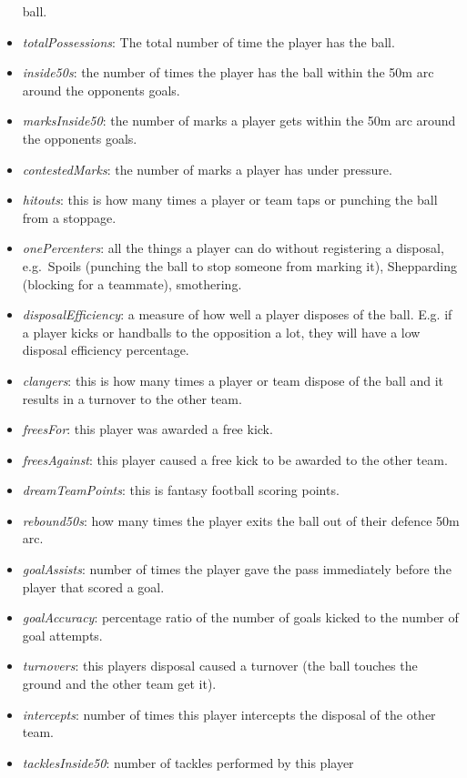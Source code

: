 \begin{itemize}
  ball.
\item
  \emph{totalPossessions}: The total number of time the player has the
  ball.
\item
  \emph{inside50s}: the number of times the player has the ball within
  the 50m arc around the opponents goals.
\item
  \emph{marksInside50}: the number of marks a player gets within the 50m
  arc around the opponents goals.
\item
  \emph{contestedMarks}: the number of marks a player has under
  pressure.
\item
  \emph{hitouts}: this is how many times a player or team taps or
  punching the ball from a stoppage.
\item
  \emph{onePercenters}: all the things a player can do without
  registering a disposal, e.g.~Spoils (punching the ball to stop someone
  from marking it), Shepparding (blocking for a teammate), smothering.
\item
  \emph{disposalEfficiency}: a measure of how well a player disposes of
  the ball. E.g. if a player kicks or handballs to the opposition a lot,
  they will have a low disposal efficiency percentage.
\item
  \emph{clangers}: this is how many times a player or team dispose of
  the ball and it results in a turnover to the other team.
\item
  \emph{freesFor}: this player was awarded a free kick.
\item
  \emph{freesAgainst}: this player caused a free kick to be awarded to
  the other team.
\item
  \emph{dreamTeamPoints}: this is fantasy football scoring points.
\item
  \emph{rebound50s}: how many times the player exits the ball out of
  their defence 50m arc.
\item
  \emph{goalAssists}: number of times the player gave the pass
  immediately before the player that scored a goal.
\item
  \emph{goalAccuracy}: percentage ratio of the number of goals kicked to
  the number of goal attempts.
\item
  \emph{turnovers}: this players disposal caused a turnover (the ball
  touches the ground and the other team get it).
\item
  \emph{intercepts}: number of times this player intercepts the disposal
  of the other team.
\item
  \emph{tacklesInside50}: number of tackles performed by this player

\end{itemize}
